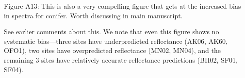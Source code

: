 \begin{reviewer}
  Figure A13: This is also a very compelling figure that gets at the increased bias in spectra for conifer. Worth discussing in main manuscript.
\end{reviewer}

See earlier comments about this. We note that even this figure shows no systematic bias---three sites have underpredicted reflectance (AK06, AK60, OFO1), two sites have overpredicted reflectance (MN02, MN04), and the remaining 3 sites have relatively accurate reflectance predictions (BH02, SF01, SF04).
